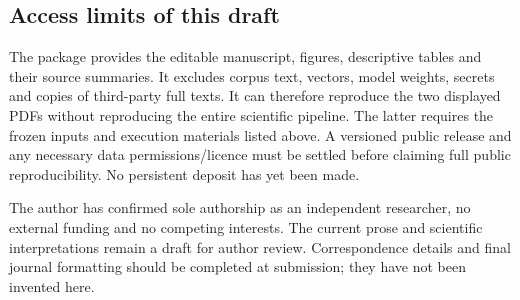 \documentclass[12pt]{article}
\begin{document}
\subsection{Access limits of this draft}
The package provides the editable manuscript, figures, descriptive tables and their source summaries. It excludes corpus text, vectors, model weights, secrets and copies of third-party full texts. It can therefore reproduce the two displayed PDFs without reproducing the entire scientific pipeline. The latter requires the frozen inputs and execution materials listed above. A versioned public release and any necessary data permissions/licence must be settled before claiming full public reproducibility. No persistent deposit has yet been made.

The author has confirmed sole authorship as an independent researcher, no external funding and no competing interests. The current prose and scientific interpretations remain a draft for author review. Correspondence details and final journal formatting should be completed at submission; they have not been invented here.

\FloatBarrier


\end{document}
